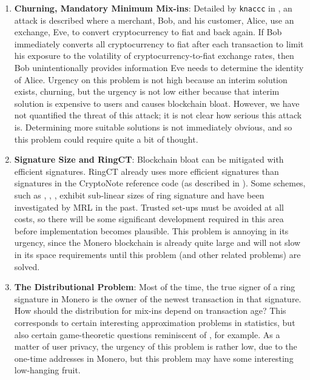 \documentclass[12pt,english]{mrl}
\theoremstyle{definition}
\numberwithin{equation}{section}
\numberwithin{figure}{section}
\numberwithin{equation}{section}
\numberwithin{equation}{section}
\numberwithin{figure}{section}
\begin{document}
\begin{enumerate}[1.]
    
    \item \textbf{Churning, Mandatory Minimum Mix-ins}: Detailed by \texttt{knaccc} in \cite{knaccc2017}, an attack is described where a merchant, Bob, and his customer, Alice, use an exchange, Eve, to convert cryptocurrency to fiat and back again. If Bob immediately converts all cryptocurrency to fiat after each transaction to limit his exposure to the volatility of cryptocurrency-to-fiat exchange rates, then Bob unintentionally provides information Eve needs to determine the identity of Alice. Urgency on this problem is not high because an interim solution exists, churning, but the urgency is not low either because that interim solution is expensive to users and causes blockchain bloat. However, we have not quantified the threat of this attack; it is not clear how serious this attack is. Determining more suitable solutions is not immediately obvious, and so this problem could require quite a bit of thought.
    
    \item \textbf{Signature Size and RingCT}:  Blockchain bloat can be mitigated with efficient signatures. RingCT already uses more efficient signatures than signatures in the CryptoNote reference code (as described in \cite{noether2016ring}). Some schemes, such as \cite{chandran2007ring},  \cite{au2006constant}, \cite{au2006event}, exhibit sub-linear sizes of ring signature and have been investigated by MRL in the past. Trusted set-ups must be avoided at all costs, so there will be some significant development required in this area before implementation becomes plausible. This problem is annoying in its urgency, since the Monero blockchain is already quite large and will not slow in its space requirements until this problem (and other related problems) are solved.
    
    
    \item \textbf{The Distributional Problem}: Most of the time, the true signer of a ring signature in Monero is the owner of the newest transaction in that signature. How should the distribution for mix-ins depend on transaction age? This corresponds to certain interesting approximation problems in statistics, but also certain game-theoretic questions reminiscent of \cite{T-1955}, for example. As a matter of user privacy, the urgency of this problem is rather low, due to the one-time addresses in Monero, but this problem may have some interesting low-hanging fruit.
    

    
    

\end{enumerate}
\end{document}
